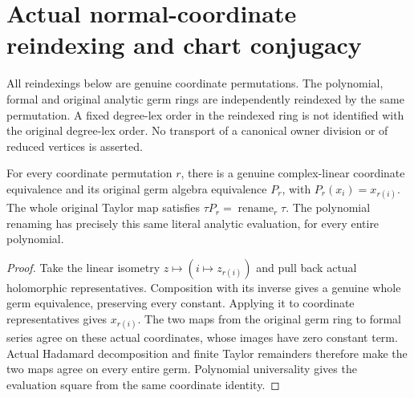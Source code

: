 \section{Actual normal-coordinate reindexing and chart conjugacy}

All reindexings below are genuine coordinate permutations. The polynomial,
formal and original analytic germ rings are independently reindexed by the
same permutation. A fixed degree-lex order in the reindexed ring is not
identified with the original degree-lex order. No transport of a canonical
owner division or of reduced vertices is asserted.

\begin{theorem}
\label{hir:actual-normal-reindex-whole-taylor}
\leanok
For every coordinate permutation $r$, there is a genuine complex-linear
coordinate equivalence and its original germ algebra equivalence $P_r$, with
$P_r(x_i)=x_{r(i)}$. The whole original Taylor map satisfies
$\tau P_r=\operatorname{rename}_r\tau$. The polynomial renaming has precisely
this same literal analytic evaluation, for every entire polynomial.
\end{theorem}
\begin{proof}
Take the linear isometry $z\mapsto(i\mapsto z_{r(i)})$ and pull back actual
holomorphic representatives. Composition with its inverse gives a genuine
whole germ equivalence, preserving every constant. Applying it to coordinate
representatives gives $x_{r(i)}$. The two maps from the original germ ring
to formal series agree on these actual coordinates, whose images have zero
constant term. Actual Hadamard decomposition and finite Taylor remainders
therefore make the two maps agree on every entire germ. Polynomial
universality gives the evaluation square from the same coordinate identity.
\end{proof}

